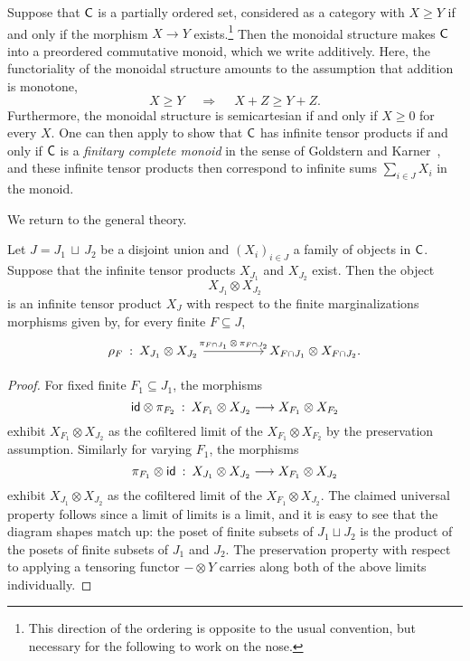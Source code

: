 \documentclass[11pt]{article}
\begin{document}
\begin{example}
	\label{poset_case}
	Suppose that $\mathsf{C}$ is a partially ordered set, considered as a category with $X \geq Y$ if and only if the morphism $X \to Y$ exists.\footnote{This direction of the ordering is opposite to the usual convention, but necessary for the following to work on the nose.} Then the monoidal structure makes $\mathsf{C}$ into a preordered commutative monoid, which we write additively. Here, the functoriality of the monoidal structure amounts to the assumption that addition is monotone,
	\[
		X \geq Y \quad\: \Longrightarrow \quad\: X + Z \geq Y + Z.
	\]
	Furthermore, the monoidal structure is semicartesian if and only if $X \geq 0$ for every $X$. One can then apply  to show that $\mathsf{C}$ has infinite tensor products if and only if $\mathsf{C}$ is a \emph{finitary complete monoid} in the sense of Goldstern and Karner~\cite[Section~2.2]{karner}, and these infinite tensor products then correspond to infinite sums $\sum_{i \in J} X_i$ in the monoid.
\end{example}

We return to the general theory.

\begin{lemma}
	\label{two_infproducts}
	Let $J = J_1 \,\sqcup\, J_2$ be a disjoint union and $(X_i)_{i \in J}$ a family of objects in $\mathsf{C}$. Suppose that the infinite tensor products $X_{J_1}$ and $X_{J_2}$ exist. Then the object
	\[
		X_{J_1} \otimes X_{J_2} 
	\]
	is an infinite tensor product $X_J$ with respect to the finite marginalizations morphisms given by, for every finite $F \subseteq J$,
	\[
		\begin{tikzcd}[column sep=huge]
			\rho_F \: : \: X_{J_1} \otimes X_{J_2} \ar{r}{\pi_{F\cap J_1} \,\otimes\, \pi_{F\cap J_2}} & X_{F \cap J_1} \otimes X_{F \cap J_2}.
		\end{tikzcd}
	\]
\end{lemma}
\begin{proof}
	For fixed finite $F_1 \subseteq J_1$, the morphisms
	\[
		\mathsf{id} \otimes \pi_{F_2} \: : \: X_{F_1} \otimes X_{J_2} \longrightarrow X_{F_1} \otimes X_{F_2}
	\]
	exhibit $X_{F_1} \otimes X_{J_2}$ as the cofiltered limit of the $X_{F_1} \otimes X_{F_2}$ by the preservation assumption. Similarly for varying $F_1$, the morphisms
	\[
		\pi_{F_1} \otimes \mathsf{id} \: : \: X_{J_1} \otimes X_{J_2} \longrightarrow X_{F_1} \otimes X_{J_2}
	\]
	exhibit $X_{J_1} \otimes X_{J_2}$ as the cofiltered limit of the $X_{F_1} \otimes X_{J_2}$. The claimed universal property follows since a limit of limits is a limit, and it is easy to see that the diagram shapes match up: the poset of finite subsets of $J_1 \sqcup J_2$ is the product of the posets of finite subsets of $J_1$ and $J_2$. The preservation property with respect to applying a tensoring functor $- \otimes Y$ carries along both of the above limits individually.
\end{proof}
\end{document}
